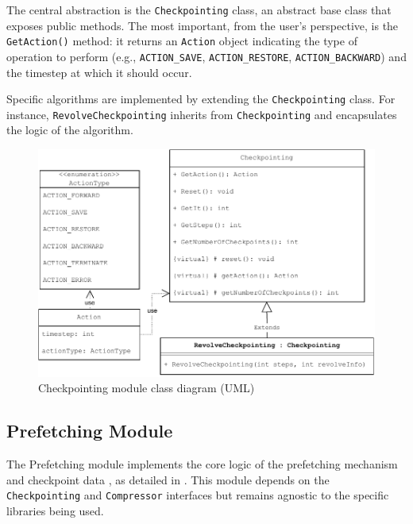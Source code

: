 \documentclass[Ingles]{ic-tese-v3}
\begin{document}
The central abstraction is the \texttt{Checkpointing} class, an abstract base class that exposes public methods. The most important, from the user's perspective, is the \texttt{GetAction()} method: it returns an \texttt{Action} object indicating the type of operation to perform (e.g., \texttt{ACTION\_SAVE}, \texttt{ACTION\_RESTORE}, \texttt{ACTION\_BACKWARD}) and the timestep at which it should occur.

Specific \checkpointing algorithms are implemented by extending the \texttt{Checkpointing} class. For instance, \texttt{RevolveCheckpointing} inherits from \texttt{Checkpointing} and encapsulates the logic of the \revolve algorithm.



\begin{figure}
  \centering
  \includegraphics[width=0.9\linewidth,trim={0 0 0 0},clip]{figures/oss/checkpointing_uml.pdf}
  \caption[Checkpointing module class diagram]{Checkpointing module class diagram (UML)}
  \label{fig:checkpointinguml}
\end{figure}

\subsection{Prefetching Module}

The Prefetching module implements the core logic of the prefetching mechanism and checkpoint data \compression, as detailed in . This module depends on the \texttt{Checkpointing} and \texttt{Compressor} interfaces but remains agnostic to the specific libraries being used. 
\end{document}
